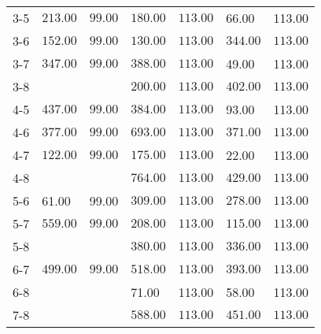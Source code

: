 \begin{table}[ht]
\begin{tabular}{rllllll}
  3-5 & \(\mathbf{213.00}\) & \(\mathbf{99.00}\) & \(\mathbf{180.00}\) & \(\mathbf{113.00}\) & 66.00 & 113.00 \\ 
  3-6 & \(\mathbf{152.00}\) & \(\mathbf{99.00}\) & \(\mathbf{130.00}\) & \(\mathbf{113.00}\) & \(\mathbf{344.00}\) & \(\mathbf{113.00}\) \\ 
  3-7 & \(\mathbf{347.00}\) & \(\mathbf{99.00}\) & \(\mathbf{388.00}\) & \(\mathbf{113.00}\) & 49.00 & 113.00 \\ 
  3-8 &  &  & \(\mathbf{200.00}\) & \(\mathbf{113.00}\) & \(\mathbf{402.00}\) & \(\mathbf{113.00}\) \\ 
  4-5 & \(\mathbf{437.00}\) & \(\mathbf{99.00}\) & \(\mathbf{384.00}\) & \(\mathbf{113.00}\) & 93.00 & 113.00 \\ 
  4-6 & \(\mathbf{377.00}\) & \(\mathbf{99.00}\) & \(\mathbf{693.00}\) & \(\mathbf{113.00}\) & \(\mathbf{371.00}\) & \(\mathbf{113.00}\) \\ 
  4-7 & \(\mathbf{122.00}\) & \(\mathbf{99.00}\) & \(\mathbf{175.00}\) & \(\mathbf{113.00}\) & 22.00 & 113.00 \\ 
  4-8 &  &  & \(\mathbf{764.00}\) & \(\mathbf{113.00}\) & \(\mathbf{429.00}\) & \(\mathbf{113.00}\) \\ 
  5-6 & 61.00 & 99.00 & \(\mathbf{309.00}\) & \(\mathbf{113.00}\) & \(\mathbf{278.00}\) & \(\mathbf{113.00}\) \\ 
  5-7 & \(\mathbf{559.00}\) & \(\mathbf{99.00}\) & \(\mathbf{208.00}\) & \(\mathbf{113.00}\) & \(\mathbf{115.00}\) & \(\mathbf{113.00}\) \\ 
  5-8 &  &  & \(\mathbf{380.00}\) & \(\mathbf{113.00}\) & \(\mathbf{336.00}\) & \(\mathbf{113.00}\) \\ 
  6-7 & \(\mathbf{499.00}\) & \(\mathbf{99.00}\) & \(\mathbf{518.00}\) & \(\mathbf{113.00}\) & \(\mathbf{393.00}\) & \(\mathbf{113.00}\) \\ 
  6-8 &  &  & 71.00 & 113.00 & 58.00 & 113.00 \\ 
  7-8 &  &  & \(\mathbf{588.00}\) & \(\mathbf{113.00}\) & \(\mathbf{451.00}\) & \(\mathbf{113.00}\) \\ 
   \bottomrule
\end{tabular}
\end{table}
